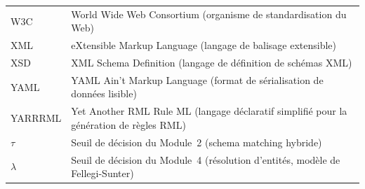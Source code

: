 \begin{longtable}{p{3.2cm} p{10.8cm}}
W3C       & World Wide Web Consortium (organisme de standardisation du Web) \\
XML       & eXtensible Markup Language (langage de balisage extensible) \\
XSD       & XML Schema Definition (langage de définition de schémas XML) \\
YAML      & YAML Ain't Markup Language (format de sérialisation de données lisible) \\
YARRRML   & Yet Another RML Rule ML (langage déclaratif simplifié pour la génération de règles RML) \\
$\tau$    & Seuil de décision du Module~2 (schema matching hybride) \\
$\lambda$ & Seuil de décision du Module~4 (résolution d'entités, modèle de Fellegi-Sunter) \\

\end{longtable}

\newpage
